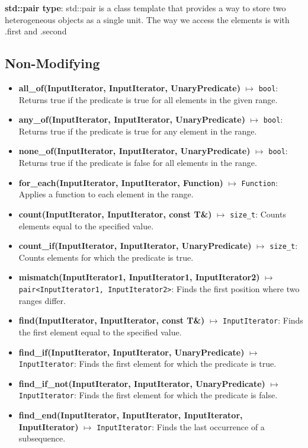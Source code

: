 \documentclass{report}
\begin{document}
    \bigbreak \noindent  
    \textbf{std::pair type}: std::pair is a class template that provides a way to store two heterogeneous objects as a single unit. The way we access the elements is with .first and .second
    \subsection{Non-Modifying}
    \begin{itemize}
        \item \textbf{all\_of(InputIterator, InputIterator, UnaryPredicate)} \(\mapsto\) \texttt{bool}: Returns true if the predicate is true for all elements in the given range.
        \item \textbf{any\_of(InputIterator, InputIterator, UnaryPredicate)} \(\mapsto\) \texttt{bool}: Returns true if the predicate is true for any element in the range.
        \item \textbf{none\_of(InputIterator, InputIterator, UnaryPredicate)} \(\mapsto\) \texttt{bool}: Returns true if the predicate is false for all elements in the range.
        \item \textbf{for\_each(InputIterator, InputIterator, Function)} \(\mapsto\) \texttt{Function}: Applies a function to each element in the range.
        \item \textbf{count(InputIterator, InputIterator, const T\&)} \(\mapsto\) \texttt{size\_t}: Counts elements equal to the specified value.
        \item \textbf{count\_if(InputIterator, InputIterator, UnaryPredicate)} \(\mapsto\) \texttt{size\_t}: Counts elements for which the predicate is true.
        \item \textbf{mismatch(InputIterator1, InputIterator1, InputIterator2)} \(\mapsto\) \texttt{pair<InputIterator1, InputIterator2>}: Finds the first position where two ranges differ.
        \item \textbf{find(InputIterator, InputIterator, const T\&)} \(\mapsto\) \texttt{InputIterator}: Finds the first element equal to the specified value.
        \item \textbf{find\_if(InputIterator, InputIterator, UnaryPredicate)} \(\mapsto\) \texttt{InputIterator}: Finds the first element for which the predicate is true.
        \item \textbf{find\_if\_not(InputIterator, InputIterator, UnaryPredicate)} \(\mapsto\) \texttt{InputIterator}: Finds the first element for which the predicate is false.
        \item \textbf{find\_end(InputIterator, InputIterator, InputIterator, InputIterator)} \(\mapsto\) \texttt{InputIterator}: Finds the last occurrence of a subsequence.

\end{itemize}
\end{document}
